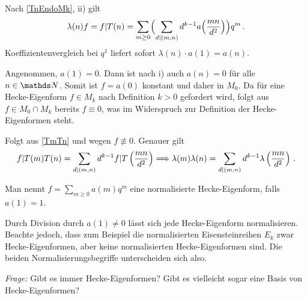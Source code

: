 \begin{bewe-list}
\item Nach \autoref{TnEndoMk}, ii) gilt
\[
\lambda(n) f = f | T(n) = \sum_{m \geq 0} \Bigl( \sum_{d \vert (m,n)} d^{k-1} a\Bigl( \frac {mn}{d^2} \Bigr) \Bigr) q^m
\,.
\]
Koeffizientenvergleich bei $q^1$ liefert sofort $\lambda (n) \cdot a(1) = a(n)$.
\item Angenommen, $a(1) = 0$. Dann ist nach i) auch $a(n) = 0$ für alle $n \in \NN$. Somit ist $f = a(0)$ konstant und daher in $M_0$. Da für eine Hecke-Eigenform $f \in M_k$ nach Definition $k > 0$ gefordert wird, folgt aus $f \in M_0 \cap M_k$ bereits $f \equiv 0$, was im Widerspruch zur Definition der Hecke-Eigenformen steht.
\item Folgt aus \autoref{TmTn} und wegen $f \not \equiv 0$. Genauer gilt
\[
f | T(m) T(n) = \sum_{d \vert (m,n)} d^{k-1} f | T \left( \frac{mn}{d^2} \right) \Longrightarrow \lambda(m) \lambda(n) = \sum_{d \vert (m,n)} d^{k-1} \lambda\left(\frac {mn}{d^2}\right)
\,.
\]
\end{bewe-list}

\begin{defi}
Man nennt $f = \sum_{m \geq 0} a(m) q^m$ eine normalisierte Hecke-Eigenform, falls $a(1) = 1$.
\end{defi}

\begin{beme}
Durch Division durch $a(1) \neq 0$ lässt sich jede Hecke-Eigenform normalisieren. Beachte jedoch, dass zum Beispiel die \glqq{}normalisierten Eisensteinreihen\grqq{} $E_k$ zwar Hecke-Eigenformen, aber keine normalisierten Hecke-Eigenformen sind. Die beiden Normalisierungsbegriffe unterscheiden sich also.
\end{beme}

\emph{Frage:} Gibt es immer Hecke-Eigenformen? Gibt es vielleicht sogar eine Basis von Hecke-Eigenformen?

